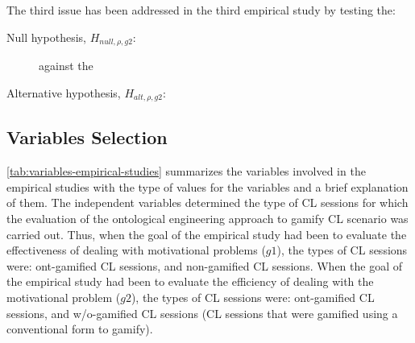 The third issue  has been addressed in the third empirical study by testing the:

\begin{description}
\item[Null hypothesis, $H_{null,\rho,g2}$:]
 against the
\item[Alternative hypothesis, $H_{alt,\rho,g2}$:]
\end{description}


\subsection{Variables Selection}

\autoref{tab:variables-empirical-studies} summarizes the variables involved in the empirical studies with the type of values for the variables and a brief explanation of them.
The independent variables  determined the type of CL sessions for which the evaluation of the ontological engineering approach to gamify CL scenario was carried out.
Thus, when the goal of the empirical study had been to evaluate the effectiveness of dealing with motivational problems ($g1$), the types of CL sessions were: 
ont-gamified CL sessions, and non-gamified CL sessions.
When the goal of the empirical study had been to evaluate the efficiency of dealing with the motivational problem ($g2$), the types of CL sessions were: ont-gamified CL sessions, and w/o-gamified CL sessions (CL sessions that were gamified using a conventional form to gamify).

